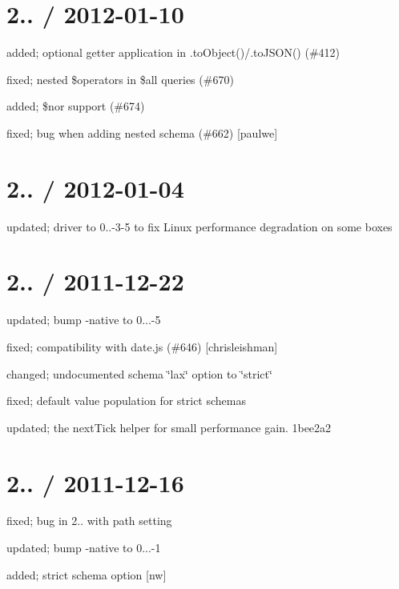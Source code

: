 \section*{2.. / 2012-\/01-\/10 }


\begin{DoxyItemize}
\item added; optional getter application in .to\+Object()/.to\+J\+S\+O\+N() (\#412)
\item fixed; nested \$operators in \$all queries (\#670)
\item added; \$nor support (\#674)
\item fixed; bug when adding nested schema (\#662) \mbox{[}paulwe\mbox{]}
\end{DoxyItemize}

\section*{2.. / 2012-\/01-\/04 }


\begin{DoxyItemize}
\item updated; driver to 0..-\/3-\/5 to fix Linux performance degradation on some boxes
\end{DoxyItemize}

\section*{2.. / 2011-\/12-\/22 }


\begin{DoxyItemize}
\item updated; bump -\/native to 0...-\/5
\item fixed; compatibility with date.\+js (\#646) \mbox{[}chrisleishman\mbox{]}
\item changed; undocumented schema \char`\"{}lax\char`\"{} option to \char`\"{}strict\char`\"{}
\item fixed; default value population for strict schemas
\item updated; the next\+Tick helper for small performance gain. 1bee2a2
\end{DoxyItemize}

\section*{2.. / 2011-\/12-\/16 }


\begin{DoxyItemize}
\item fixed; bug in 2.. with path setting
\item updated; bump -\/native to 0...-\/1
\item added; strict schema option \mbox{[}nw\mbox{]}
\end{DoxyItemize}

